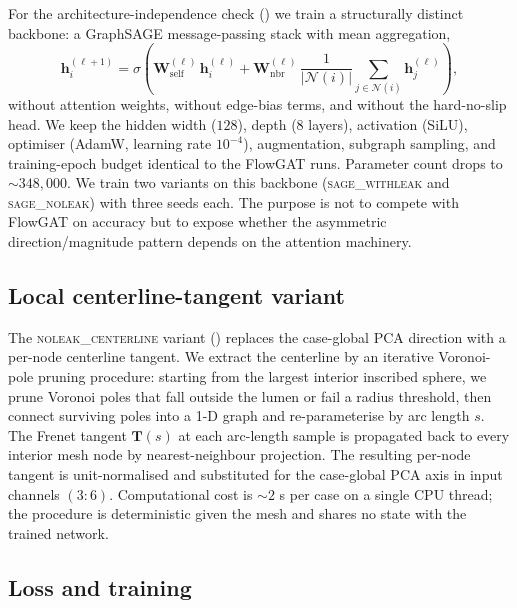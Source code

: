 \documentclass[10pt,a4paper]{article}
\newcommand{\centerlinenoleak}{\textsc{noleak\_centerline}}
\newcommand{\sagewithleak}{\textsc{sage\_withleak}}
\newcommand{\sagenoleak}{\textsc{sage\_noleak}}
\begin{document}
For the architecture-independence check () we train a
structurally distinct backbone: a GraphSAGE message-passing stack
with mean aggregation,
\[
\mathbf{h}_i^{(\ell+1)} = \sigma\!\left(\mathbf{W}_\mathrm{self}^{(\ell)}\,\mathbf{h}_i^{(\ell)}
+ \mathbf{W}_\mathrm{nbr}^{(\ell)}\,\frac{1}{|\mathcal{N}(i)|}\!\!\sum_{j\in\mathcal{N}(i)}\!\!\mathbf{h}_j^{(\ell)}\right),
\]
without attention weights, without edge-bias terms, and without the
hard-no-slip head. We keep the hidden width ($128$), depth ($8$
layers), activation (SiLU), optimiser (AdamW, learning rate
$10^{-4}$), augmentation, subgraph sampling, and training-epoch
budget identical to the FlowGAT runs. Parameter count drops to
$\sim\!348{,}000$. We train two variants on this backbone
(\sagewithleak{} and \sagenoleak{}) with three seeds each. The
purpose is not to compete with FlowGAT on accuracy but to expose
whether the asymmetric direction/magnitude pattern depends on the
attention machinery.

\subsection*{Local centerline-tangent variant}

The \centerlinenoleak{} variant () replaces the
case-global PCA direction with a per-node centerline tangent. We
extract the centerline by an iterative Voronoi-pole pruning
procedure: starting from the largest interior inscribed sphere, we
prune Voronoi poles that fall outside the lumen or fail a radius
threshold, then connect surviving poles into a 1-D graph and
re-parameterise by arc length $s$. The Frenet tangent
$\mathbf{T}(s)$ at each arc-length sample is propagated back to every
interior mesh node by nearest-neighbour projection. The resulting
per-node tangent is unit-normalised and substituted for the
case-global PCA axis in input channels $(3{:}6)$. Computational cost
is $\sim\!2$ s per case on a single CPU thread; the procedure is
deterministic given the mesh and shares no state with the trained
network.

\subsection*{Loss and training}
\end{document}
